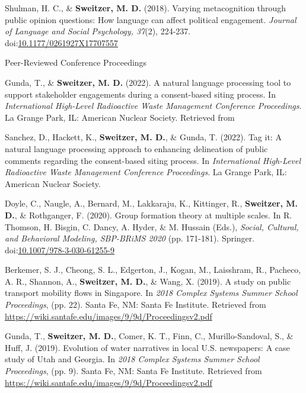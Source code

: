 \documentclass[letterpaper, 10pt]{extarticle}
\renewenvironment{itemize}{
  \begin{list}{}{
    \setlength{\leftmargin}{10pt}
  }
}{
  \end{list}
}
\begin{document}
\begin{itemize}
\item \hangindent=20pt Shulman, H. C., \& \textbf{Sweitzer, M. D.} (2018). Varying metacognition through public opinion questions: How language can affect political engagement. \textit{Journal of Language and Social Psychology, 37}(2), 224-237. doi:\href{https://github.com/Matt-Sweitzer/Papers/blob/master/ShulmanSweitzer2018b.pdf}{10.1177/0261927X17707557}
\end{itemize}

\vspace{0.3em}
{\large Peer-Reviewed Conference Proceedings}

\begin{itemize}
\setlength\itemindent{-0.5em}
\item Gunda, T., \& \textbf{Sweitzer, M. D.} (2022). A natural language processing tool to support stakeholder engagements during a consent-based siting process. In \textit{International High-Level Radioactive Waste Management Conference Proceedings}. La Grange Park, IL: American Nuclear Society. Retrieved from 

\item Sanchez, D., Hackett, K., \textbf{Sweitzer, M. D.}, \& Gunda, T. (2022). Tag it: A natural language processing approach to enhancing delineation of public comments regarding the consent-based siting process. In \textit{International High-Level Radioactive Waste Management Conference Proceedings}. La Grange Park, IL: American Nuclear Society.

\item Doyle, C., Naugle, A., Bernard, M., Lakkaraju, K., Kittinger, R., \textbf{Sweitzer, M. D.}, \& Rothganger, F. (2020). Group formation theory at multiple scales. In R. Thomson, H. Bisgin, C. Dancy, A. Hyder, \& M. Hussain (Eds.), \textit{Social, Cultural, and Behavioral Modeling, SBP-BRiMS 2020} (pp. 171-181). Springer. doi:\href{https://github.com/Matt-Sweitzer/Papers/blob/master/Doyleetal2020.pdf}{10.1007/978-3-030-61255-9}

\item Berkemer, S. J., Cheong, S. L., Edgerton, J., Kogan, M., Laisshram, R., Pacheco, A. R., Shannon, A., \textbf{Sweitzer, M. D.}, \& Wang, X. (2019). A study on public transport mobility flows in Singapore. In \textit{2018 Complex Systems Summer School Proceedings}, (pp. 22). Santa Fe, NM: Santa Fe Institute. Retrieved from \href{https://github.com/Matt-Sweitzer/Papers/blob/master/SFI_CSSS_Proceedings.pdf}{https://wiki.santafe.edu/images/9/9d/Proceedings\textunderscore v2.pdf}

\item Gunda, T., \textbf{Sweitzer, M. D.}, Comer, K. T., Finn, C., Murillo-Sandoval, S., \& Huff, J. (2019). Evolution of water narratives in local U.S. newspapers: A case study of Utah and Georgia. In \textit{2018 Complex Systems Summer School Proceedings}, (pp. 9). Santa Fe, NM: Santa Fe Institute. Retrieved from \href{https://github.com/Matt-Sweitzer/Papers/blob/master/SFI_CSSS_Proceedings.pdf}{https://wiki.santafe.edu/images/9/9d/Proceedings\textunderscore v2.pdf}
\end{itemize}
\end{document}

